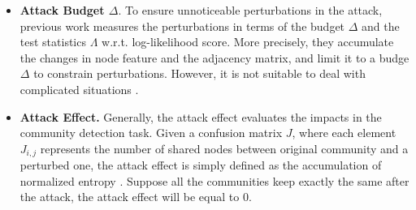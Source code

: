 \begin{itemize}
	\item \textbf{Attack Budget $\Delta$}. To ensure unnoticeable perturbations in the attack, previous work \cite{zugner2018adversarial} measures the perturbations in terms of the budget $\Delta$ and the test statistics $\Lambda$ w.r.t. log-likelihood score. More precisely, they accumulate the changes in node feature and the adjacency matrix, and limit it to a budge $\Delta$ to constrain perturbations. However, it is not suitable to deal with complicated situations \cite{zugner2018adversarial}.

	\item \textbf{Attack Effect.} Generally, the attack effect evaluates the impacts in the community detection task.  Given a confusion matrix $J$, where each element $J_{i,j}$ represents the number of shared nodes between original community and a perturbed one, the attack effect is simply defined as the accumulation of normalized entropy \cite{chen2019multiscale}. Suppose all the communities keep exactly the same after the attack, the attack effect will be equal to $0$.

\end{itemize}